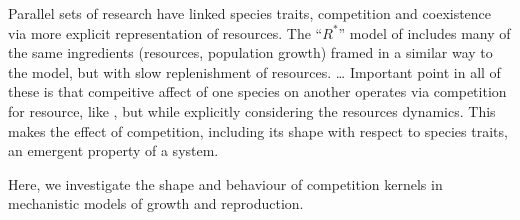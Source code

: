 \documentclass[a4paper,11pt]{article}
\newcommand{\Rstar}{\ensuremath{R^*}}
\begin{document}
%
Parallel sets of research have linked species traits, competition and
coexistence via more explicit representation of resources.
%
The ``\Rstar'' model of \citet{Tilman-1982} includes many of the same
ingredients (resources, population growth) framed in a similar way to
the \citet{MacArthur-1967} model, but with slow replenishment of
resources.
\ldots
%
Important point in all of these is that compeitive affect of one
species on another operates via competition for resource, like
\citet{MacArthur-1967}, but while explicitly considering the resources
dynamics.  This makes the effect of competition, including its shape
with respect to species traits, an emergent property of a system.

%
%
Here, we investigate the shape and behaviour of competition kernels in
mechanistic models of growth and reproduction.
\end{document}
